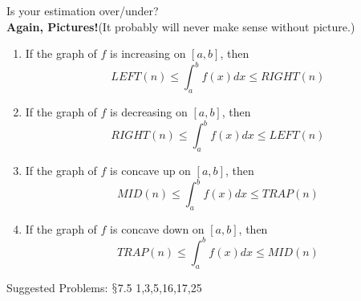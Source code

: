 \documentclass[12pt]{article}
\theoremstyle{definition}
\theoremstyle{definition}
\theoremstyle{remark}
\theoremstyle{definition}
\theoremstyle{definition}
\theoremstyle{definition}
\begin{document}
Is your estimation over/under?\\

\textbf{Again, Pictures!}(It probably will never make sense without picture.)
\begin{enumerate}
\item If the graph of $f$ is increasing on $[a,b]$, then $$LEFT(n)\leq \int^b_a f(x) dx \leq RIGHT(n)$$
\item If the graph of $f$ is decreasing on $[a,b]$, then $$RIGHT(n)\leq \int^b_a f(x) dx \leq LEFT(n)$$
\item If the graph of $f$ is concave up on $[a,b]$, then $$MID(n)\leq \int^b_a f(x) dx \leq TRAP(n)$$
\item If the graph of $f$ is concave down on $[a,b]$, then $$TRAP(n)\leq \int^b_a f(x) dx \leq MID(n)$$

\end{enumerate}

Suggested Problems: $\mathsection$7.5	1,3,5,16,17,25
\end{document}
